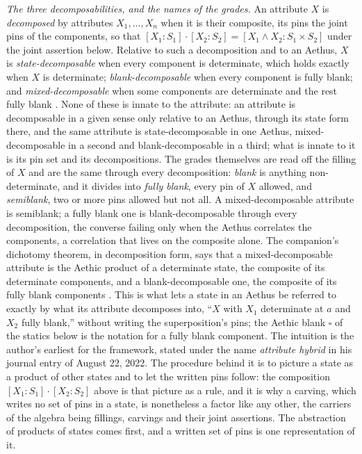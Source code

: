 \textit{The three decomposabilities, and the names of the grades.} An attribute $X$ is \emph{decomposed} by attributes $X_1, \ldots, X_n$ when it is their composite, its pins the joint pins of the components, so that $[X_1 : S_1] \cdot [X_2 : S_2] = [X_1 \wedge X_2 : S_1 \times S_2]$ under the joint assertion below. Relative to such a decomposition and to an Aethus, $X$ is \emph{state-decomposable} when every component is determinate, which holds exactly when $X$ is determinate; \emph{blank-decomposable} when every component is fully blank; and \emph{mixed-decomposable} when some components are determinate and the rest fully blank \cite{Aethus}. None of these is innate to the attribute: an attribute is decomposable in a given sense only relative to an Aethus, through its state form there, and the same attribute is state-decomposable in one Aethus, mixed-decomposable in a second and blank-decomposable in a third; what is innate to it is its pin set and its decompositions. The grades themselves are read off the filling of $X$ and are the same through every decomposition: \emph{blank} is anything non-determinate, and it divides into \emph{fully blank}, every pin of $X$ allowed, and \emph{semiblank}, two or more pins allowed but not all. A mixed-decomposable attribute is semiblank; a fully blank one is blank-decomposable through every decomposition, the converse failing only when the Aethus correlates the components, a correlation that lives on the composite alone. The companion's dichotomy theorem, in decomposition form, says that a mixed-decomposable attribute is the Aethic product of a determinate state, the composite of its determinate components, and a blank-decomposable one, the composite of its fully blank components \cite{Aethus}. This is what lets a state in an Aethus be referred to exactly by what its attribute decomposes into, ``$X$ with $X_1$ determinate at $a$ and $X_2$ fully blank,'' without writing the superposition's pins; the Aethic blank $\square$ of the statics below is the notation for a fully blank component. The intuition is the author's earliest for the framework, stated under the name \emph{attribute hybrid} in his journal entry of August 22, 2022. The procedure behind it is to picture a state as a product of other states and to let the written pins follow: the composition $[X_1 : S_1] \cdot [X_2 : S_2]$ above is that picture as a rule, and it is why a carving, which writes no set of pins in a state, is nonetheless a factor like any other, the carriers of the algebra being fillings, carvings and their joint assertions. The abstraction of products of states comes first, and a written set of pins is one representation of it.
